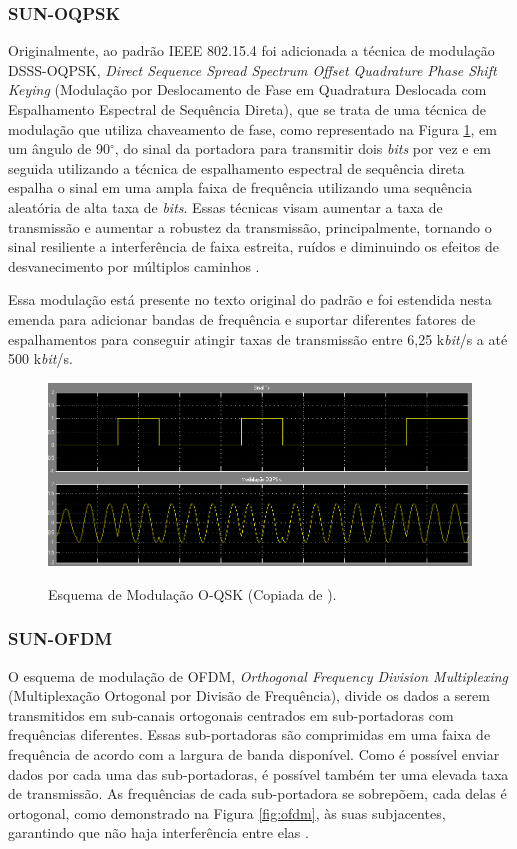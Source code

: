 \subsubsection{SUN-OQPSK}
\label{oqpsk}
Originalmente, ao padrão IEEE 802.15.4 foi adicionada a técnica de modulação DSSS-OQPSK, \emph{Direct Sequence Spread Spectrum Offset Quadrature Phase Shift Keying} (Modulação por Deslocamento de Fase em Quadratura Deslocada com Espalhamento Espectral de Sequência Direta), que se trata de uma técnica de modulação que utiliza chaveamento de fase, como representado na Figura \ref{fig:oqpsk}, em um ângulo de 90$^{\circ}$, do sinal da portadora para transmitir dois \emph{bits} por vez e em seguida utilizando a técnica de espalhamento espectral de sequência direta espalha o sinal em uma ampla faixa de frequência utilizando uma sequência aleatória de alta taxa de \emph{bits}. Essas técnicas visam aumentar a taxa de transmissão e aumentar a robustez da transmissão, principalmente, tornando o sinal resiliente a interferência de faixa estreita, ruídos e diminuindo os efeitos de desvanecimento por múltiplos caminhos \cite{goldsmith2005wireless}.

Essa modulação está presente no texto original do padrão e foi estendida nesta emenda para adicionar bandas de frequência e suportar diferentes fatores de espalhamentos para conseguir atingir taxas de transmissão entre 6,25 k\emph{bit}/s a até 500 k\emph{bit}/s.

\begin{figure}[ht]
      \begin{center}
            \includegraphics[width=.7\textwidth]{./sections/textual/chapters/images/oqpsk.png}\\
            \caption{Esquema de Modulação O-QSK (Copiada de \cite{figOQPSK}).}
            \label{fig:oqpsk}
      \end{center}
\end{figure}


\subsubsection{SUN-OFDM}
O esquema de modulação de OFDM, \emph{Orthogonal Frequency Division Multiplexing} (Multiplexação Ortogonal por Divisão de Frequência), divide os dados a serem transmitidos em sub-canais ortogonais centrados em  sub-portadoras com frequências diferentes. Essas sub-portadoras são comprimidas em uma faixa de frequência de acordo com a largura de banda disponível. Como é possível enviar dados por cada uma das sub-portadoras, é possível também ter uma elevada taxa de transmissão. As frequências de cada sub-portadora se sobrepõem, cada delas é ortogonal, como demonstrado na Figura \ref{fig:ofdm}, às suas subjacentes, garantindo que não haja interferência entre elas \cite{rappaport2009}\cite{goldsmith2005wireless}.


